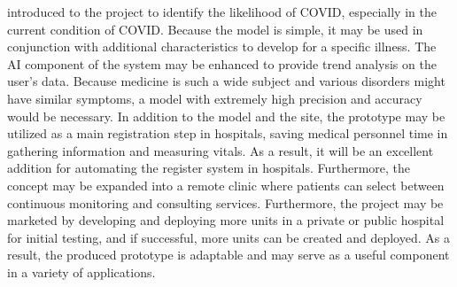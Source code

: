 \documentclass{bmcart}
\begin{document}
introduced to the project to identify the likelihood of COVID, especially in the
current condition of COVID. Because the model is simple, it may be used in
conjunction with additional characteristics to develop for a specific illness.
The AI component of the system may be enhanced to provide trend analysis on the
user's data. Because medicine is such a wide subject and various disorders might
have similar symptoms, a model with extremely high precision and accuracy would
be necessary. In addition to the model and the site, the prototype may be
utilized as a main registration step in hospitals, saving medical personnel time
in gathering information and measuring vitals. As a result, it will be an
excellent addition for automating the register system in hospitals. Furthermore,
the concept may be expanded into a remote clinic where patients can select
between continuous monitoring and consulting services. Furthermore, the project
may be marketed by developing and deploying more units in a private or public
hospital for initial testing, and if successful, more units can be created and
deployed. As a result, the produced prototype is adaptable and may serve as a
useful component in a variety of applications.

\end{document}
